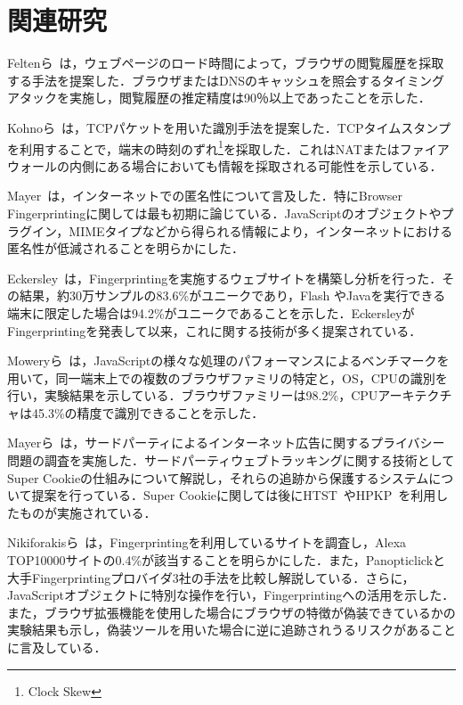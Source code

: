 \newpage
\section{関連研究}
Feltenら~\cite{felten2000timing}は，ウェブページのロード時間によって，ブラウザの閲覧履歴を採取する手法を提案した．ブラウザまたはDNSのキャッシュを照会するタイミングアタックを実施し，閲覧履歴の推定精度は90％以上であったことを示した．

Kohnoら~\cite{kohno2005remote}は，TCPパケットを用いた識別手法を提案した．TCPタイムスタンプを利用することで，端末の時刻のずれ\footnote{Clock Skew}を採取した．これはNATまたはファイアウォールの内側にある場合においても情報を採取される可能性を示している．

Mayer~\cite{mayer2009any}は，インターネットでの匿名性について言及した．特にBrowser Fingerprintingに関しては最も初期に論じている．JavaScriptのオブジェクトやプラグイン，MIMEタイプなどから得られる情報により，インターネットにおける匿名性が低減されることを明らかにした．

Eckersley~\cite{eckersley2010unique}は，Fingerprintingを実施するウェブサイトを構築し分析を行った．その結果，約30万サンプルの83.6\%がユニークであり，Flash やJavaを実行できる端末に限定した場合は94.2\%がユニークであることを示した．EckersleyがFingerprintingを発表して以来，これに関する技術が多く提案されている．

Moweryら~\cite{mowery2011fingerprinting}は，JavaScriptの様々な処理のパフォーマンスによるベンチマークを用いて，同一端末上での複数のブラウザファミリの特定と，OS，CPUの識別を行い，実験結果を示している．ブラウザファミリーは98.2\%，CPUアーキテクチャは45.3\%の精度で識別できることを示した．

Mayerら~\cite{mayer2012third}は，サードパーティによるインターネット広告に関するプライバシー問題の調査を実施した．サードパーティウェブトラッキングに関する技術としてSuper Cookieの仕組みについて解説し，それらの追跡から保護するシステムについて提案を行っている．Super Cookieに関しては後にHTST~\cite{hsts}やHPKP~\cite{hpkp}を利用したものが実施されている．

Nikiforakisら~\cite{nikiforakis2013cookieless}は，Fingerprintingを利用しているサイトを調査し，Alexa TOP10000サイトの0.4\%が該当することを明らかにした．また，Panopticlickと大手Fingerprintingプロバイダ3社の手法を比較し解説している．さらに，JavaScriptオブジェクトに特別な操作を行い，Fingerprintingへの活用を示した．また，ブラウザ拡張機能を使用した場合にブラウザの特徴が偽装できているかの実験結果も示し，偽装ツールを用いた場合に逆に追跡されうるリスクがあることに言及している．

